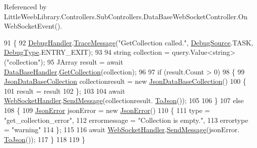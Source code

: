 Referenced by Little\+Weeb\+Library.\+Controllers.\+Sub\+Controllers.\+Data\+Base\+Web\+Socket\+Controller.\+On\+Web\+Socket\+Event().


\begin{DoxyCode}
91         \{
92             \mbox{\hyperlink{class_little_weeb_library_1_1_handlers_1_1_debug_handler}{DebugHandler}}.\mbox{\hyperlink{class_little_weeb_library_1_1_handlers_1_1_debug_handler_afccb37dfd6b2114af72000c2f4fe4607}{TraceMessage}}(\textcolor{stringliteral}{"GetCollection called."}, 
      \mbox{\hyperlink{namespace_little_weeb_library_1_1_handlers_a2a6ca0775121c9c503d58aa254d292be}{DebugSource}}.TASK, \mbox{\hyperlink{namespace_little_weeb_library_1_1_handlers_ab66019ed40462876ec4e61bb3ccb0a62}{DebugType}}.ENTRY\_EXIT);
93 
94             \textcolor{keywordtype}{string} collection = query.Value<\textcolor{keywordtype}{string}>(\textcolor{stringliteral}{"collection"});
95             JArray result = await \mbox{\hyperlink{class_little_weeb_library_1_1_handlers_1_1_data_base_handler}{DataBaseHandler}}.\mbox{\hyperlink{class_little_weeb_library_1_1_handlers_1_1_data_base_handler_ae04312874502a18b241c1123ef963b90}{GetCollection}}(collection);
96 
97             \textcolor{keywordflow}{if} (result.Count > 0)
98             \{
99                 \mbox{\hyperlink{class_little_weeb_library_1_1_models_1_1_json_data_base_collection}{JsonDataBaseCollection}} collectionresult = \textcolor{keyword}{new} 
      \mbox{\hyperlink{class_little_weeb_library_1_1_models_1_1_json_data_base_collection}{JsonDataBaseCollection}}()
100                 \{
101                     result = result
102                 \};
103 
104                 await \mbox{\hyperlink{class_little_weeb_library_1_1_handlers_1_1_web_socket_handler}{WebSocketHandler}}.\mbox{\hyperlink{class_little_weeb_library_1_1_handlers_1_1_web_socket_handler_a1de289d54d665a32c93478c68d3e6ad0}{SendMessage}}(collectionresult.
      \mbox{\hyperlink{class_little_weeb_library_1_1_models_1_1_json_data_base_collection_a2df5ba56e4691271213328b9bc2dbb1f}{ToJson}}());
105 
106             \}
107             \textcolor{keywordflow}{else}
108             \{
109                 \mbox{\hyperlink{class_little_weeb_library_1_1_models_1_1_json_error}{JsonError}} jsonError = \textcolor{keyword}{new} \mbox{\hyperlink{class_little_weeb_library_1_1_models_1_1_json_error}{JsonError}}()
110                 \{
111                     type = \textcolor{stringliteral}{"get\_collection\_error"},
112                     errormessage = \textcolor{stringliteral}{"Collection is empty."},
113                     errortype = \textcolor{stringliteral}{"warning"}
114                 \};
115 
116                 await \mbox{\hyperlink{class_little_weeb_library_1_1_handlers_1_1_web_socket_handler}{WebSocketHandler}}.\mbox{\hyperlink{class_little_weeb_library_1_1_handlers_1_1_web_socket_handler_a1de289d54d665a32c93478c68d3e6ad0}{SendMessage}}(jsonError.
      \mbox{\hyperlink{class_little_weeb_library_1_1_models_1_1_json_error_a0e3e7dd2e2990404b7f0461742b23440}{ToJson}}());
117             \}
118 
119         \}
\end{DoxyCode}
